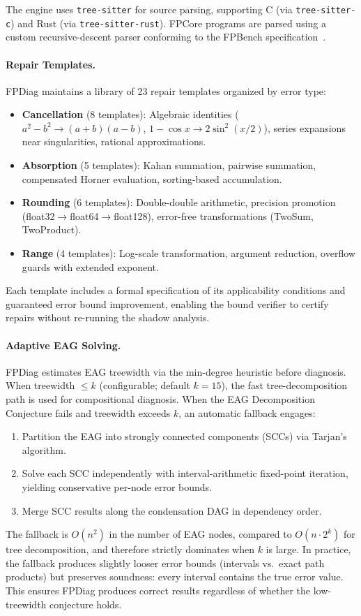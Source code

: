 \documentclass[11pt]{article}
\begin{document}
The engine uses \texttt{tree-sitter} for source parsing, supporting C (via \texttt{tree-sitter-c}) and Rust (via \texttt{tree-sitter-rust}). FPCore programs are parsed using a custom recursive-descent parser conforming to the FPBench specification~\cite{fpbench}.

\paragraph{Repair Templates.}
FPDiag maintains a library of 23 repair templates organized by error type:
\begin{itemize}
\item \textbf{Cancellation} (8 templates): Algebraic identities ($a^2-b^2 \to (a+b)(a-b)$, $1-\cos x \to 2\sin^2(x/2)$), series expansions near singularities, rational approximations.
\item \textbf{Absorption} (5 templates): Kahan summation, pairwise summation, compensated Horner evaluation, sorting-based accumulation.
\item \textbf{Rounding} (6 templates): Double-double arithmetic, precision promotion (float32$\to$float64$\to$float128), error-free transformations (TwoSum, TwoProduct).
\item \textbf{Range} (4 templates): Log-scale transformation, argument reduction, overflow guards with extended exponent.
\end{itemize}

Each template includes a formal specification of its applicability conditions and guaranteed error bound improvement, enabling the bound verifier to certify repairs without re-running the shadow analysis.

\paragraph{Adaptive EAG Solving.}
FPDiag estimates EAG treewidth via the min-degree heuristic before diagnosis.
When treewidth $\le k$ (configurable; default $k{=}15$), the fast
tree-decomposition path is used for compositional diagnosis.
When the EAG Decomposition Conjecture fails and treewidth exceeds $k$, an
automatic fallback engages:
\begin{enumerate}
  \item Partition the EAG into strongly connected components (SCCs) via
        Tarjan's algorithm.
  \item Solve each SCC independently with interval-arithmetic fixed-point
        iteration, yielding conservative per-node error bounds.
  \item Merge SCC results along the condensation DAG in dependency order.
\end{enumerate}
The fallback is $O(n^2)$ in the number of EAG nodes, compared to
$O(n \cdot 2^k)$ for tree decomposition, and therefore strictly dominates
when $k$ is large.  In practice, the fallback produces slightly looser
error bounds (intervals vs.\ exact path products) but preserves
soundness: every interval contains the true error value.  This ensures
FPDiag produces correct results regardless of whether the low-treewidth
conjecture holds.
\end{document}
